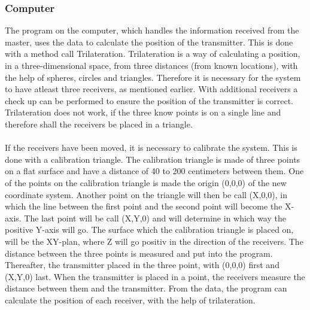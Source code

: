 \subsubsection{Computer}
The program on the computer, which handles the information received from the master, uses the data to calculate the position of the transmitter. This is done with a method call Trilateration. Trilateration is a way of calculating a position, in a three-dimensional space, from three distances (from known locations), with the help of spheres, circles and triangles. Therefore it is necessary for the system to have atleast three receivers, as mentioned earlier.  With additional receivers a check up can be performed to ensure the position of the transmitter is correct. Trilateration does not work, if the three know points is on a single line and therefore shall the receivers be placed in a triangle.\\\\
\noindent
If the receivers have been moved, it is necessary to calibrate the system. This is done with a calibration triangle. The calibration triangle is made of three points on a flat surface and have a distance of 40 to 200 centimeters between them. One of the points on the calibration triangle is made the origin (0,0,0) of the new coordinate system. Another point on the triangle will then be call (X,0,0), in which the line between the first point and the second point will become the X-axis. The last point will be call (X,Y,0) and will determine in which way the positive Y-axis will go. The surface which the calibration triangle is placed on, will be the XY-plan, where Z will go positiv in the direction of the receivers. The distance between the three points is measured and put into the program. Thereafter, the transmitter placed in the three point, with (0,0,0) first and (X,Y,0) last. When the transmitter is placed in a point, the receivers measure the distance between them and the transmitter. From the data, the program can calculate the position of each receiver, with the help of trilateration. \\\\


